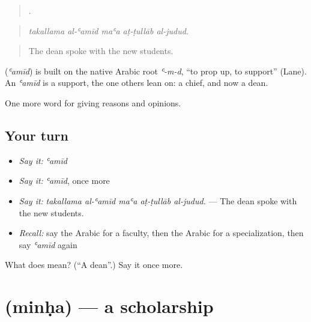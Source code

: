 \begin{quote}
    .
\end{quote}

\begin{quote}
\emph{takallama al-ʿamīd maʿa aṭ-ṭullāb al-judud.}
\end{quote}

\begin{quote}
The dean spoke with the new students.
\end{quote}

\begin{cousinweb}
\textbf{} (\emph{ʿamīd}) is built on the native Arabic root \emph{ʿ-m-d}, \textquotedblleft{}to prop up, to support\textquotedblright{} (Lane). An \emph{ʿamīd} is a support, the one others lean on: a chief, and now a dean.
\end{cousinweb}

\begin{grammarlens}[title={What you've built}]
One more word for giving reasons and opinions.
\end{grammarlens}

\subsection*{Your turn}
\begin{itemize}
\raggedright
  \item \emph{Say it:} \emph{ʿamīd}
  \item \emph{Say it:} \emph{ʿamīd}, once more
  \item \emph{Say it:} \emph{takallama al-ʿamīd maʿa aṭ-ṭullāb al-judud.} — The dean spoke with the new students.
  \item \emph{Recall:} say the Arabic for a faculty, then the Arabic for a specialization, then say \emph{ʿamīd} again
\end{itemize}

\begin{tcolorbox}[breakable,colback=teal!4,colframe=teal!35!black,title={Before you move on}]
What does  mean? (\textquotedblleft{}A dean\textquotedblright{}.) Say it once more.
\end{tcolorbox}
\section[\texorpdfstring{\ar{منحة} (minḥa)}{منحة (minḥa)}]{ (minḥa) — a scholarship}

